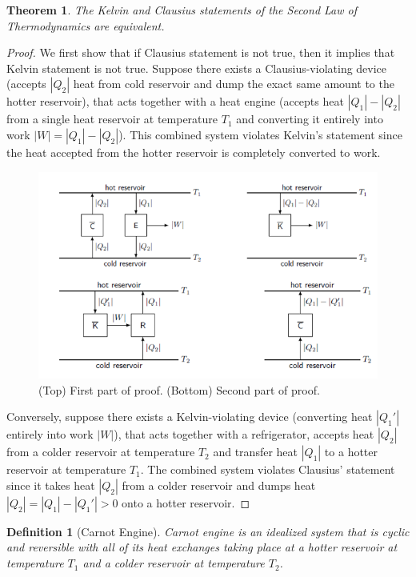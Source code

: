 \documentclass[a4paper]{article}
\theoremstyle{new}
\newtheorem{defi}{Definition}[section]
\newtheorem{thm}{Theorem}[section]
\begin{document}
\begin{thm}
The Kelvin and Clausius statements of the Second Law of Thermodynamics are equivalent.
\end{thm}
\begin{proof}
We first show that if Clausius statement is not true, then it implies that Kelvin statement is not true. Suppose there exists a Clausius-violating device (accepts $|Q_2|$ heat from cold reservoir and dump the exact same amount to the hotter reservoir), that acts together with a heat engine (accepts heat $|Q_1|-|Q_2|$ from a single heat reservoir at temperature $T_1$ and converting it entirely into work $|W|=|Q_1|-|Q_2|$). This combined system violates Kelvin's statement since the heat accepted from the hotter reservoir is completely converted to work.
\begin{figure}[H]
    \centering
    \includegraphics[scale=0.6]{secondlaw2.PNG}
    \caption{(Top) First part of proof. (Bottom) Second part of proof. \cite{blundell2010concepts}}
\end{figure}
Conversely, suppose there exists a Kelvin-violating device (converting heat $|Q_1'|$ entirely into work $|W|$), that acts together with a refrigerator, accepts heat $|Q_2|$ from a colder reservoir at temperature $T_2$ and transfer heat $|Q_1|$ to a hotter reservoir at temperature $T_1$. The combined system violates Clausius' statement since it takes heat $|Q_2|$ from a colder reservoir and dumps heat $|Q_2|=|Q_1|-|Q_1'|>0$ onto a hotter reservoir.
\end{proof}
\begin{defi}[Carnot Engine]
Carnot engine is an idealized system that is cyclic and reversible with all of its heat exchanges taking place at a hotter reservoir at temperature $T_1$ and a colder reservoir at temperature $T_2$.
\end{defi}
\end{document}
